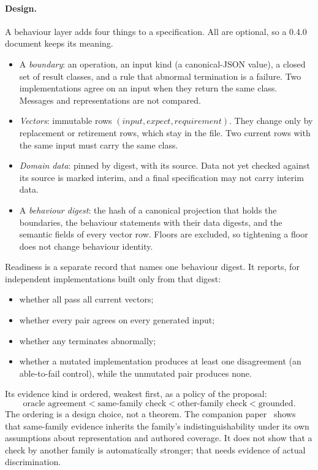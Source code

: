 \documentclass[11pt]{article}
\theoremstyle{definition}
\theoremstyle{remark}
\begin{document}
\paragraph{Design.} A behaviour layer adds four things to a specification. All are optional, so a
0.4.0 document keeps its meaning.
\begin{itemize}[itemsep=1pt]
\item A \emph{boundary}: an operation, an input kind (a canonical-JSON value), a closed set of
  result classes, and a rule that abnormal termination is a failure. Two implementations agree on
  an input when they return the same class. Messages and representations are not compared.
\item \emph{Vectors}: immutable rows $(\mathit{input},\mathit{expect},\mathit{requirement})$. They
  change only by replacement or retirement rows, which stay in the file. Two current rows with the
  same input must carry the same class.
\item \emph{Domain data}: pinned by digest, with its source. Data not yet checked against its
  source is marked interim, and a final specification may not carry interim data.
\item A \emph{behaviour digest}: the hash of a canonical projection that holds the boundaries,
  the behaviour statements with their data digests, and the semantic fields of every vector row.
  Floors are excluded, so tightening a floor does not change behaviour identity.
\end{itemize}
Readiness is a separate record that names one behaviour digest. It reports, for independent
implementations built only from that digest:
\begin{itemize}[itemsep=1pt]
\item whether all pass all current vectors;
\item whether every pair agrees on every generated input;
\item whether any terminates abnormally;
\item whether a mutated implementation produces at least one disagreement (an able-to-fail
  control), while the unmutated pair produces none.
\end{itemize}
Its evidence kind is ordered, weakest first, as a policy of the proposal:
\[
\text{oracle agreement} < \text{same-family check} < \text{other-family check} < \text{grounded}.
\]
The ordering is a design choice, not a theorem. The companion paper~\cite{matijasevic2026psm} shows
that same-family evidence inherits the family's indistinguishability under its own assumptions about
representation and authored coverage. It does not show that a check by another family is
automatically stronger; that needs evidence of actual discrimination.
\end{document}

